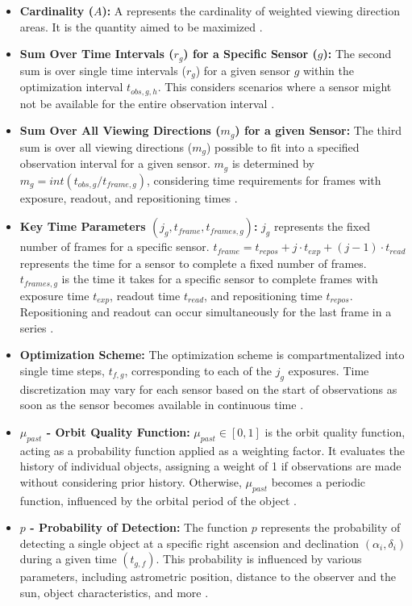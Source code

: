 \begin{itemize}
	\item \textbf{Cardinality ($A$):} A represents the cardinality of weighted viewing direction areas. It is the quantity aimed to be maximized \cite{fruh3}.
	\item \textbf{Sum Over Time Intervals ($r_g$) for a Specific Sensor ($g$):} The second sum is over single time intervals ($r_g$) for a given sensor $g$ within the optimization interval $t_{obs,g,h}$. This considers scenarios where a sensor might not be available for the entire observation interval \cite{fruh3}.
	\item \textbf{Sum Over All Viewing Directions ($m_g$) for a given Sensor:} The third sum is over all viewing directions ($m_g$) possible to fit into a specified observation interval for a given sensor. $m_g$ is determined by $m_g = int(t_{obs,g}/t_{frame,g})$, considering time requirements for frames with exposure, readout, and repositioning times \cite{fruh3}.
	\item \textbf{Key Time Parameters $(j_g, t_{frame}, t_{frames,g})$:}  $j_g$ represents the fixed number of frames for a specific sensor. $t_{frame} = t_{repos} + j · t_{exp} + (j − 1)· t_{read}$ represents the time for a sensor to complete a fixed number of frames. $t_{frames,g}$ is the time it takes for a specific sensor to complete frames with exposure time $t_{exp}$, readout time $t_{read}$, and repositioning time $t_{repos}$. Repositioning and readout can occur simultaneously for the last frame in a series \cite{fruh3}.
	\item \textbf{Optimization Scheme:}  The optimization scheme is compartmentalized into single time steps, $t_{f,g}$, corresponding to each of the $j_g$ exposures. Time discretization may vary for each sensor based on the start of observations as soon as the sensor becomes available in continuous time \cite{fruh3}.
	\item \textbf{$\mu_{past}$ - Orbit Quality Function:} $\mu_{past} ∈ [0, 1]$ is the orbit quality function, acting as a probability function applied as a weighting factor. It evaluates the history of individual objects, assigning a weight of 1 if observations are made without considering prior history. Otherwise, $\mu_{past}$ becomes a periodic function, influenced by the orbital period of the object \cite{fruh3}.
	\item \textbf{$p$ - Probability of Detection:} The function $p$ represents the probability of detecting a single object at a specific right ascension and declination $(\alpha_i, \delta_i)$ during a given time $(t_{g,f})$. This probability is influenced by various parameters, including astrometric position, distance to the observer and the sun, object characteristics, and more \cite{fruh3}.

\end{itemize}
